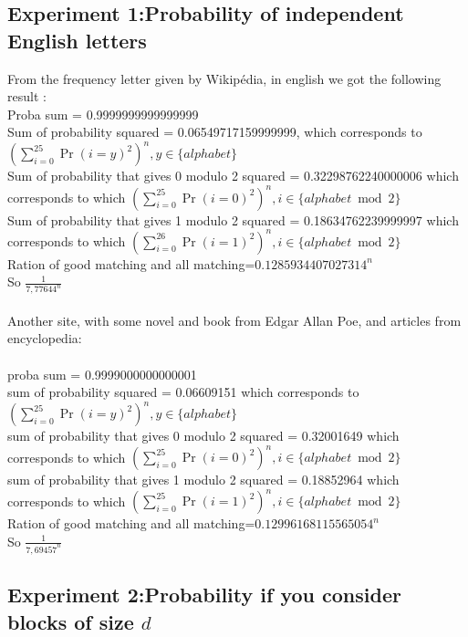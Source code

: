\documentclass{article}
\begin{document}
\subsection{Experiment 1:Probability of independent English letters}
From the frequency letter given by Wikip\'edia, in english we got the following result :\\
Proba sum = 0.9999999999999999\\
Sum of probability squared = 0.06549717159999999, which corresponds to $(\sum_{i=0}^{25}{\Pr(i=y)^2})^n, y \in \{alphabet\} $\\
Sum of probability that gives 0 modulo 2 squared  = 0.32298762240000006 which corresponds to which $(\sum_{i=0}^{25}{\Pr(i=0)^2})^n, i \in \{alphabet \bmod 2\} $\\
Sum of probability that gives 1 modulo 2 squared = 0.18634762239999997 which corresponds to which $(\sum_{i=0}^{26}{\Pr(i=1)^2})^n, i \in \{alphabet \bmod 2\} $\\
Ration of good matching and all matching=$0.1285934407027314^n$\\
So $\frac{1}{7,77644^n}$
\\
\\
Another site, with some novel and book from Edgar Allan Poe, and articles from encyclopedia:\\
\\
proba sum = 0.9999000000000001\\
sum of probability squared = 0.06609151 which corresponds to $(\sum_{i=0}^{25}{\Pr(i=y)^2})^n, y \in \{alphabet\} $\\
sum of probability that gives 0 modulo 2 squared = 0.32001649 which corresponds to which $(\sum_{i=0}^{25}{\Pr(i=0)^2})^n, i \in \{alphabet \bmod 2\} $\\
sum of probability that gives 1 modulo 2 squared = 0.18852964 which corresponds to which $(\sum_{i=0}^{25}{\Pr(i=1)^2})^n, i \in \{alphabet \bmod 2\} $\\
Ration of good matching and all matching=$0.12996168115565054^n$\\
So $\frac{1}{7,69457^n}$

\subsection{Experiment 2:Probability if you consider blocks of size $d$}
\end{document}
